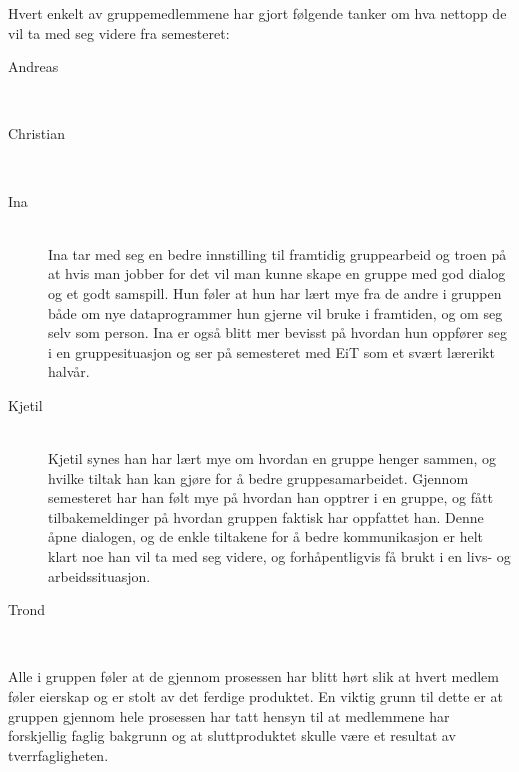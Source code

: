Hvert enkelt av gruppemedlemmene har gjort følgende tanker om hva nettopp de vil ta med seg videre fra semesteret:
\begin{description}
\item[Andreas] \hfill \\

\item[Christian] \hfill \\

\item[Ina] \hfill \\
Ina tar med seg en bedre innstilling til framtidig gruppearbeid og troen på at hvis man jobber for 
det vil man kunne skape en gruppe med god dialog og et godt samspill. Hun føler at hun har lært mye fra de andre
i gruppen både om nye dataprogrammer hun gjerne vil bruke i framtiden, og om seg selv som person.
Ina er også blitt mer bevisst på hvordan hun oppfører seg i en gruppesituasjon og ser på semesteret med
EiT som et svært lærerikt halvår.

\item[Kjetil] \hfill \\
Kjetil synes han har lært mye om hvordan en gruppe henger sammen, og
hvilke tiltak han kan gjøre for å bedre gruppesamarbeidet. Gjennom
semesteret har han følt mye på hvordan han opptrer i en gruppe, og fått
tilbakemeldinger på hvordan gruppen faktisk har oppfattet han. Denne
åpne dialogen, og de enkle tiltakene for å bedre kommunikasjon er helt
klart noe han vil ta med seg videre, og forhåpentligvis få brukt i en
livs- og arbeidssituasjon.

\item[Trond] \hfill \\

\end{description}
Alle i gruppen føler at de gjennom prosessen har blitt hørt slik at hvert medlem føler eierskap og er stolt av det ferdige produktet. 
En viktig grunn til dette er at gruppen gjennom hele prosessen har tatt hensyn til at medlemmene har forskjellig faglig bakgrunn og 
at sluttproduktet skulle være et resultat av tverrfagligheten.


